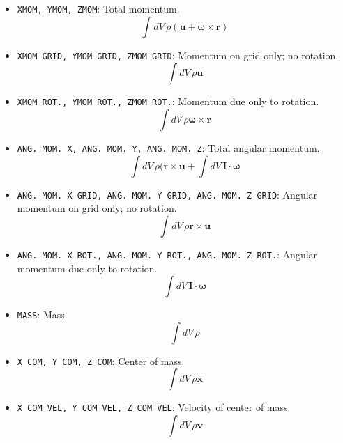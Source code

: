 \documentclass[12pt]{book}
\begin{document}
\begin{itemize}
  \item \texttt{XMOM, YMOM, ZMOM}: Total momentum.
  \begin{equation}
    \int dV\, \rho (\mathbf{u} + {\bm \omega} \times \mathbf{r})
  \end{equation}

  \item \texttt{XMOM GRID, YMOM GRID, ZMOM GRID}: Momentum on grid only; no rotation.
  \begin{equation}
    \int dV\, \rho \mathbf{u}
  \end{equation}

  \item \texttt{XMOM ROT., YMOM ROT., ZMOM ROT.}: Momentum due only to rotation.
  \begin{equation}
    \int dV\, \rho {\bm \omega} \times \mathbf{r}
  \end{equation}

  \item \texttt{ANG. MOM. X, ANG. MOM. Y, ANG. MOM. Z}: Total angular momentum.
  \begin{equation}
    \int dV\, \rho(\mathbf{r} \times \mathbf{u} + \int dV\, \mathbf{I} \cdot {\bm \omega}
  \end{equation}

  \item \texttt{ANG. MOM. X GRID, ANG. MOM. Y GRID, ANG. MOM. Z GRID}: Angular momentum on grid only; no rotation.
  \begin{equation}
    \int dV\, \rho\mathbf{r} \times \mathbf{u}
  \end{equation}

  \item \texttt{ANG. MOM. X ROT., ANG. MOM. Y ROT., ANG. MOM. Z ROT.}: Angular momentum due only to rotation.
  \begin{equation}
    \int dV\, \mathbf{I} \cdot {\bm \omega}
  \end{equation}

  \item \texttt{MASS}: Mass.
  \begin{equation}
    \int dV\, \rho
  \end{equation}

  \item \texttt{X COM, Y COM, Z COM}: Center of mass.
  \begin{equation}
    \int dV\, \rho \mathbf{x}
  \end{equation}

  \item \texttt{X COM VEL, Y COM VEL, Z COM VEL}: Velocity of center of mass.
  \begin{equation}
    \int dV\, \rho \mathbf{v}
  \end{equation}


\end{itemize}
\end{document}
